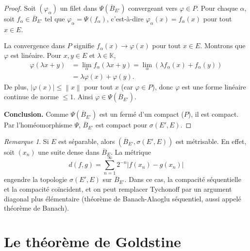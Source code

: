 \documentclass[a4paper,12pt]{book}
\newcommand{\K}{\mathbb{K}}
\newcommand{\norm}[1]{\left\| #1 \right\|}
\newcommand{\abs}[1]{\left| #1 \right|}
\theoremstyle{definition}
\theoremstyle{plain}
\theoremstyle{remark}
\newtheorem{remarque}[definition]{Remarque}
\begin{document}
\begin{proof}
Soit $(\varphi_\alpha)$ un filet dans $\Psi(\overline{B}_{E'})$ convergeant vers
$\varphi \in P$. Pour chaque $\alpha$, soit $f_\alpha \in \overline{B}_{E'}$ tel que
$\varphi_\alpha = \Psi(f_\alpha)$, c'est-à-dire $\varphi_\alpha(x) = f_\alpha(x)$
pour tout $x \in E$.

La convergence dans $P$ signifie $f_\alpha(x) \to \varphi(x)$ pour tout $x \in E$.
Montrons que $\varphi$ est linéaire. Pour $x, y \in E$ et $\lambda \in \K$,
\begin{align*}
  \varphi(\lambda x + y) &= \lim_\alpha f_\alpha(\lambda x + y)
  = \lim_\alpha (\lambda f_\alpha(x) + f_\alpha(y)) \\
  &= \lambda \varphi(x) + \varphi(y).
\end{align*}
De plus, $\abs{\varphi(x)} \le \norm{x}$ pour tout $x$ (car $\varphi \in P$), donc
$\varphi$ est une forme linéaire continue de norme $\le 1$. Ainsi
$\varphi \in \Psi(\overline{B}_{E'})$.

\medskip
\noindent\textbf{Conclusion.}
Comme $\Psi(\overline{B}_{E'})$ est un fermé d'un compact ($P$), il est compact.
Par l'homéomorphisme $\Psi$, $\overline{B}_{E'}$ est compact pour $\sigma(E',E)$.
\end{proof}

\begin{remarque}
\label{rem:alaoglu-separable}
Si $E$ est séparable, alors $(\overline{B}_{E'}, \sigma(E',E))$ est métrisable.
En effet, soit $(x_n)$ une suite dense dans $\overline{B}_E$. La métrique
\[
  d(f,g) = \sum_{n=1}^{\infty} 2^{-n} \abs{f(x_n) - g(x_n)}
\]
engendre la topologie $\sigma(E',E)$ sur $\overline{B}_{E'}$. Dans ce cas,
la compacité séquentielle et la compacité coïncident, et on peut remplacer
Tychonoff par un argument diagonal plus élémentaire
(théorème de Banach-Alaoglu séquentiel,
aussi appelé théorème de Banach).
\end{remarque}


\section{Le théorème de Goldstine}
\label{sec:goldstine}
\end{document}

